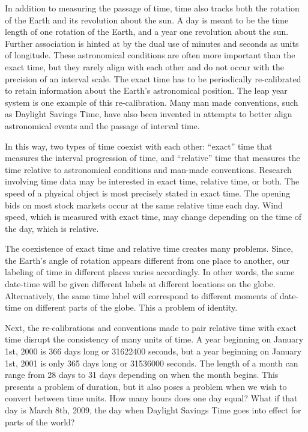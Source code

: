 \documentclass[article]{jss}
\begin{document}
In addition to measuring the passage of time, time also tracks both the rotation of the Earth and its revolution about the sun.  A day is meant to be the time length of one rotation of the Earth, and a year one revolution about the sun.  Further association is hinted at by the dual use of minutes and seconds as units of longitude.  These astronomical conditions are often more important than the exact time, but they rarely align with each other and do not occur with the precision of an interval scale.  The exact time has to be periodically re-calibrated to retain information about the Earth's astronomical position.  The leap year system is one example of this re-calibration. Many man made conventions, such as Daylight Savings Time, have also been invented in attempts to better align astronomical events and the passage of interval time.

In this way, two types of time coexist with each other: ``exact'' time that measures the interval progression of time, and ``relative'' time that measures the time relative to astronomical conditions and man-made conventions. Research involving time data may be interested in exact time, relative time, or both. The speed of a physical object is most precisely stated in exact time. The opening bids on most stock markets occur at the same relative time each day.  Wind speed, which is measured with exact time, may change depending on the time of the day, which is relative. 

The coexistence of exact time and relative time creates many problems. Since, the Earth's angle of rotation appears different from one place to another, our labeling of time in different places varies accordingly. In other words, the same date-time will be given different labels at different locations on the globe. Alternatively, the same time label will correspond to different moments of date-time on different parts of the globe.  This a problem of identity.

Next, the re-calibrations and conventions made to pair relative time with exact time disrupt the consistency of many units of time.  A year beginning on January 1st, 2000 is 366 days long or 31622400 seconds, but a year beginning on January 1st, 2001 is only 365 days long or 31536000 seconds.  The length of a month can range from 28 days to 31 days depending on when the month begins. This presents a problem of duration, but it also poses a problem when we wish to convert between time units. How many hours does one day equal? What if that day is March 8th, 2009, the day when Daylight Savings Time goes into effect for parts of the world?
\end{document}
